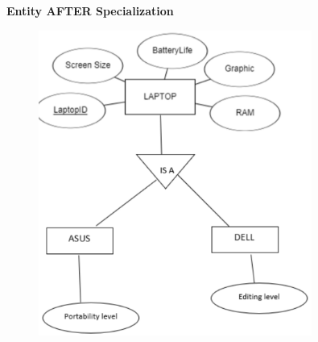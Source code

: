 \documentclass[a4paper, 12pt]{article}
\begin{document}
       \textbf{Entity AFTER Specialization} %
       \begin{figure}[H]
        \includegraphics[width=0.8\textwidth]{chapter2c_7.png}
       \end{figure}
    \newpage
\end{document}
